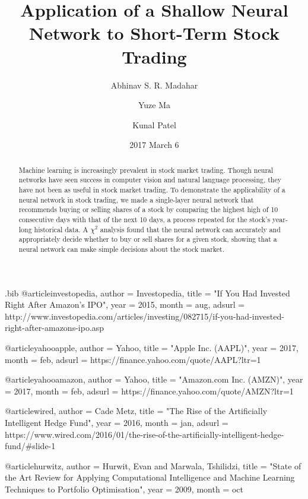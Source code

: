 \documentclass[twocolumn]{article}
\begin{document}
\begin{filecontents}{\jobname.bib}
@article{investopedia,
   author = {{Investopedia}},
    title = "{If You Had Invested Right After Amazon's IPO}",
     year = 2015,
    month = aug,
   adsurl = {http://www.investopedia.com/articles/investing/082715/if-you-had-invested-right-after-amazons-ipo.asp}
}

@article{yahooapple,
   author = {{Yahoo}},
    title = "{Apple Inc. (AAPL)}",
     year = 2017,
    month = feb,
   adsurl = {https://finance.yahoo.com/quote/AAPL?ltr=1}
}

@article{yahooamazon,
   author = {{Yahoo}},
    title = "{Amazon.com Inc. (AMZN)}",
     year = 2017,
    month = feb,
   adsurl = {https://finance.yahoo.com/quote/AMZN?ltr=1}
}

@article{wired,
   author = {{Cade Metz}},
    title = "{The Rise of the Artificially Intelligent Hedge Fund}",
     year = 2016,
    month = jan,
   adsurl = {https://www.wired.com/2016/01/the-rise-of-the-artificially-intelligent-hedge-fund/#slide-1}
}

@article{hurwitz,
   author = {Hurwit, Evan and Marwala, Tshilidzi},
    title = "{State of the Art Review for Applying Computational Intelligence and Machine Learning Techniques to Portfolio Optimisation}",
     year = 2009,
    month = oct
}
\end{filecontents}

\date{2017 March 6}

\title{Application of a Shallow Neural Network to Short-Term Stock Trading}

\author[1]{Abhinav S. R. Madahar}
\author[2]{Yuze Ma}
\author[3]{Kunal Patel}

\maketitle

\begin{abstract}
Machine learning is increasingly prevalent in stock market trading. Though neural networks have seen success in computer vision and natural language processing, they have not been as useful in stock market trading. To demonstrate the applicability of a neural network in stock trading, we made a single-layer neural network that recommends buying or selling shares of a stock by comparing the highest high of 10 consecutive days with that of the next 10 days, a process repeated for the stock's year-long historical data. A $\chi^2$ analysis found that the neural network can accurately and appropriately decide whether to buy or sell shares for a given stock, showing that a neural network can make simple decisions about the stock market.
\end{abstract}
\end{document}
